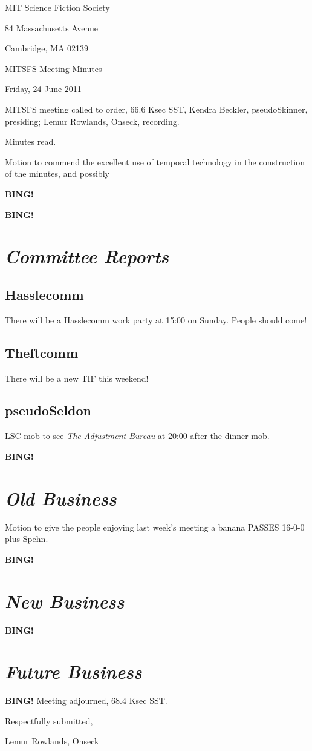 \documentclass[10pt]{article}
\newcommand{\bing}{{\bf BING!} }
\newcommand{\goto}[1]{\bing \vskip 12pt \section*{{\em{#1}}}}
\newcommand{\ps}{ plus Spehn\xspace}
\newcommand{\skinner}{Kendra Beckler, pseudoSkinner}
\newcommand{\onseck}{Lemur Rowlands, Onseck}
\newcommand{\meetingdate}{Friday, 24 June 2011}
\begin{document}
\begin{center}

MIT Science Fiction Society

84 Massachusetts Avenue

Cambridge, MA 02139

\vspace{12pt}

MITSFS Meeting Minutes

\meetingdate

\end{center}

\vspace{18pt}

\setlength{\parskip}{6pt}

\noindent
MITSFS meeting called to order, 66.6 Ksec SST,
\skinner, presiding; \onseck, recording.

Minutes read.

Motion to commend the excellent use of temporal technology in the construction
of the minutes, and possibly

\bing

\goto{Committee Reports}

\subsection*{Hasslecomm}

There will be a Hasslecomm work party at 15:00 on Sunday.  People should come!

\subsection*{Theftcomm}

There will be a new TIF this weekend!

\subsection*{pseudoSeldon}

LSC mob to see \emph{The Adjustment Bureau} at 20:00 after the dinner mob.

\goto{Old Business}

Motion to give the people enjoying last week's meeting a banana PASSES
16-0-0\ps.

\goto{New Business}

\goto{Future Business}

\bing
\noindent
Meeting adjourned, 68.4 Ksec SST.

\vspace{18pt}

\centerline{Respectfully submitted,}
\centerline{\onseck}
\end{document}
